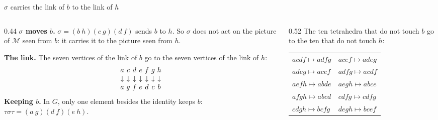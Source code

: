 \iffalse
\begin{frame}{\(\sigma\) carries the link of \(b\) to the link of \(h\)}
\begin{columns}[t]
\begin{column}{0.44\textwidth}
\textbf{\(\sigma\) moves \(b\).} \(\sigma=(b\ h)(c\ g)(d\ f)\) sends \(b\) to \(h\). So \(\sigma\) does not act on the picture of \(\mathcal M\) seen from \(b\): it carries it to the picture seen from \(h\).
\par
\textbf{The link.} The seven vertices of the link of \(b\) go to the seven vertices of the link of \(h\):
\[
\begin{array}{c@{\ }c@{\ }c@{\ }c@{\ }c@{\ }c@{\ }c}
a&c&d&e&f&g&h\\
\downarrow&\downarrow&\downarrow&\downarrow&\downarrow&\downarrow&\downarrow\\
a&g&f&e&d&c&b
\end{array}
\]
\textbf{Keeping \(b\).} In \(G\), only one element besides the identity keeps \(b\): \(\tau\sigma\tau=(a\ g)(d\ f)(e\ h)\).
\end{column}
\begin{column}{0.52\textwidth}\centering
\vspace{4mm}
{\small The ten tetrahedra that do not touch \(b\) go to the ten that do not touch \(h\):}
\par\medskip
\begin{tabular}{l@{\qquad}l}
\(acdf\mapsto adfg\) & \(acef\mapsto adeg\)\\
\(adeg\mapsto acef\) & \(adfg\mapsto acdf\)\\
\(aefh\mapsto abde\) & \(aegh\mapsto abce\)\\
\(afgh\mapsto abcd\) & \(cdfg\mapsto cdfg\)\\
\(cdgh\mapsto bcfg\) & \(degh\mapsto bcef\)\\
\end{tabular}
\end{column}
\end{columns}
\end{frame}

